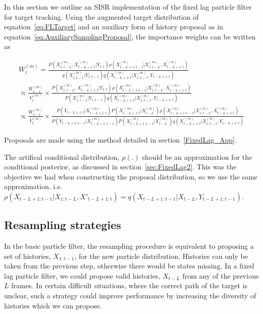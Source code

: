 In this section we outline an SISR implementation of the fixed lag particle filter for target tracking. Using the augmented target distribution of equation~\ref{eq:FLTarget} and an auxiliary form of history proposal as in equation~\ref{eq:AuxiliarySamplingProposal}, the importance weights can be written as

\begin{multline}
W_t^{(m)} = \frac{ P(X_{1:t-L}^{(m)}, X_{t-L+1:t}^{'(m)}|Y_{1:t}) \rho(X_{t-L+1:t-1}^{(m)}|X_{1:t-L}^{(m)}, X_{t-L+1:t}^{'(m)}) }{ q(X_{1:t-1}^{(m)}|Y_{1:t-1}) q(X_{t-L+1:t}^{'(m)}|X_{1:t-1}^{(m)}, Y_{t-L+1:t}) } \\
\approx \frac{W_{t-1}^{(m)}}{V_t^{(m)}} \times \frac{ P(X_{1:t-L}^{(m)}, X_{t-L+1:t}^{'(m)}|Y_{1:t}) \rho(X_{t-L+1:t-1}^{(m)}|X_{1:t-L}^{(m)}, X_{t-L+1:t}^{'(m)}) }{ P(X_{1:t-1}^{(m)}|Y_{1:t-1}) q(X_{t-L+1:t}^{'(m)}|X_{1:t-1}^{(m)}, Y_{t-L+1:t}) } \\
\propto \frac{W_{t-1}^{(m)}}{V_t^{(m)}} \times \frac{ P(Y_{t-L+1:t}|X_{t-L+1:t}^{'(m)}) P(X_{t-L+1:t}^{'(m)}|X_{t-L}^{(m)}) \rho(X_{t-L+1:t-1}^{(m)}|X_{1:t-L}^{(m)}, X_{t-L+1:t}^{'(m)}) }{ P(Y_{t-L+1:t-1}|X_{t-L+1:t-1}^{(m)}) P(X_{t-L+1:t-1}^{(m)}|X_{t-L}^{(m)}) q(X_{t-L+1:t}^{'(m)}|X_{1:t-1}^{(m)}, Y_{t-L+1:t}) }
\label{eq:}
\end{multline}

Proposals are made using the method detailed in section~\ref{FixedLag_App}.

The artifical conditional distribution, $\rho(.)$ should be an approximation for the conditional posterior, as discussed in section~\ref{sec:FixedLag2}. This was the objective we had when constructing the proposal distribution, so we use the same approximation. i.e. $\rho(X_{t-L+1:t-1}|X_{1:t-L}, X'_{t-L+1:t}) = q(X_{t-L+1:t-1}|X_{t-L}, Y_{t-L+1:t-1})$.



\subsection{Resampling strategies}
In the basic particle filter, the resampling procedure is equivalent to proposing a set of histories, $X_{1:t-1}$, for the new particle distribution. Histories can only be taken from the previous step, otherwise there would be states missing. In a fixed lag particle filter, we could propose valid histories, $X_{t-L}$ from any of the previous $L$ frames. In certain difficult situations, where the correct path of the target is unclear, such a strategy could improve performance by increasing the diversity of histories which we can propose.

